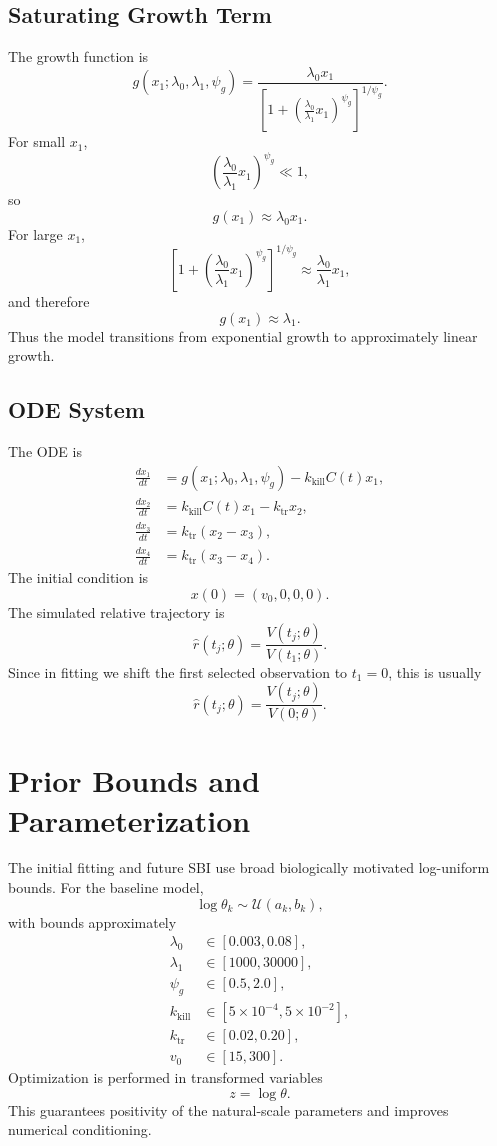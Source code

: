\documentclass[11pt,a4paper]{article}
\newcommand{\Unif}{\mathcal{U}}
\begin{document}
\subsection{Saturating Growth Term}

The growth function is
\[
    g(x_1;\lambda_0,\lambda_1,\psi_g)
    = \frac{\lambda_0 x_1}
    {\left[1+\left(\frac{\lambda_0}{\lambda_1}x_1\right)^{\psi_g}\right]^{1/\psi_g}}.
\]
For small $x_1$,
\[
    \left(\frac{\lambda_0}{\lambda_1}x_1\right)^{\psi_g} \ll 1,
\]
so
\[
    g(x_1) \approx \lambda_0 x_1.
\]
For large $x_1$,
\[
    \left[1+\left(\frac{\lambda_0}{\lambda_1}x_1\right)^{\psi_g}\right]^{1/\psi_g}
    \approx \frac{\lambda_0}{\lambda_1}x_1,
\]
and therefore
\[
    g(x_1) \approx \lambda_1.
\]
Thus the model transitions from exponential growth to approximately linear growth.

\subsection{ODE System}

The ODE is
\[
\begin{aligned}
    \frac{dx_1}{dt}
    &= g(x_1;\lambda_0,\lambda_1,\psi_g)
       - k_{\mathrm{kill}} C(t) x_1,\\
    \frac{dx_2}{dt}
    &= k_{\mathrm{kill}} C(t) x_1 - k_{\mathrm{tr}}x_2,\\
    \frac{dx_3}{dt}
    &= k_{\mathrm{tr}}(x_2-x_3),\\
    \frac{dx_4}{dt}
    &= k_{\mathrm{tr}}(x_3-x_4).
\end{aligned}
\]
The initial condition is
\[
    x(0) = (v_0,0,0,0).
\]
The simulated relative trajectory is
\[
    \hat{r}(t_j;\theta)
    = \frac{V(t_j;\theta)}{V(t_1;\theta)}.
\]
Since in fitting we shift the first selected observation to $t_1=0$, this is usually
\[
    \hat{r}(t_j;\theta)=\frac{V(t_j;\theta)}{V(0;\theta)}.
\]

\section{Prior Bounds and Parameterization}

The initial fitting and future SBI use broad biologically motivated log-uniform bounds. For the baseline model,
\[
    \log \theta_k \sim \Unif(a_k,b_k),
\]
with bounds approximately
\[
\begin{aligned}
    \lambda_0 &\in [0.003,0.08],\\
    \lambda_1 &\in [1000,30000],\\
    \psi_g &\in [0.5,2.0],\\
    k_{\mathrm{kill}} &\in [5\times 10^{-4}, 5\times 10^{-2}],\\
    k_{\mathrm{tr}} &\in [0.02,0.20],\\
    v_0 &\in [15,300].
\end{aligned}
\]
Optimization is performed in transformed variables
\[
    z = \log \theta.
\]
This guarantees positivity of the natural-scale parameters and improves numerical conditioning.
\end{document}
